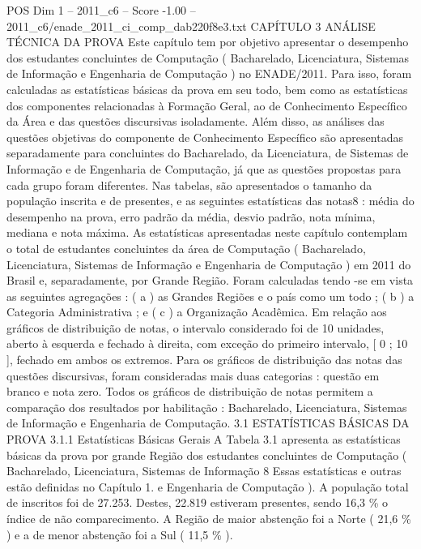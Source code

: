 \begin{textsample}{POS Dim 1 – 2011\_c6 – Score -1.00 – 2011\_c6/enade\_2011\_ci\_comp\_dab220f8e3.txt}  \label{ex:f1_pos_211}
CAPÍTULO 3 ANÁLISE TÉCNICA DA PROVA Este capítulo tem por objetivo apresentar o desempenho dos estudantes concluintes de Computação ( Bacharelado, Licenciatura, Sistemas de Informação e Engenharia de Computação ) no ENADE/2011.
Para isso, foram calculadas as estatísticas básicas da prova em seu todo, bem como as estatísticas dos componentes relacionadas à Formação Geral, ao de Conhecimento Específico da Área e das questões discursivas isoladamente.
Além disso, as análises das questões objetivas do componente de Conhecimento Específico são apresentadas separadamente para concluintes do Bacharelado, da Licenciatura, de Sistemas de Informação e de Engenharia de Computação, já que as questões propostas para cada grupo foram diferentes.
Nas tabelas, são apresentados o tamanho da população inscrita e de presentes, e as seguintes estatísticas das notas8 : média do desempenho na prova, erro padrão da média, desvio padrão, nota mínima, mediana e nota máxima.
As estatísticas apresentadas neste capítulo contemplam o total de estudantes concluintes da área de Computação ( Bacharelado, Licenciatura, Sistemas de Informação e Engenharia de Computação ) em 2011 do Brasil e, separadamente, por Grande Região.
Foram calculadas tendo -se em vista as seguintes agregações : ( a ) as Grandes Regiões e o país como um todo ; ( b ) a Categoria Administrativa ; e ( c ) a Organização Acadêmica.
Em relação aos gráficos de distribuição de notas, o intervalo considerado foi de 10 unidades, aberto à esquerda e fechado à direita, com exceção do primeiro intervalo, [ 0 ; 10 ], fechado em ambos os extremos.
Para os gráficos de distribuição das notas das questões discursivas, foram consideradas mais duas categorias : questão em branco e nota zero.
Todos os gráficos de distribuição de notas permitem a comparação dos resultados por habilitação : Bacharelado, Licenciatura, Sistemas de Informação e Engenharia de Computação. 3.1 ESTATÍSTICAS BÁSICAS DA PROVA 3.1.1 Estatísticas Básicas Gerais A Tabela 3.1 apresenta as estatísticas básicas da prova por grande Região dos estudantes concluintes de Computação ( Bacharelado, Licenciatura, Sistemas de Informação 8 Essas estatísticas e outras estão definidas no Capítulo 1. e Engenharia de Computação ).
A população total de inscritos foi de 27.253.
Destes, 22.819 estiveram presentes, sendo 16,3 \% o índice de não comparecimento.
A Região de maior abstenção foi a Norte ( 21,6 \% ) e a de menor abstenção foi a Sul ( 11,5 \% ).

\end{textsample}
